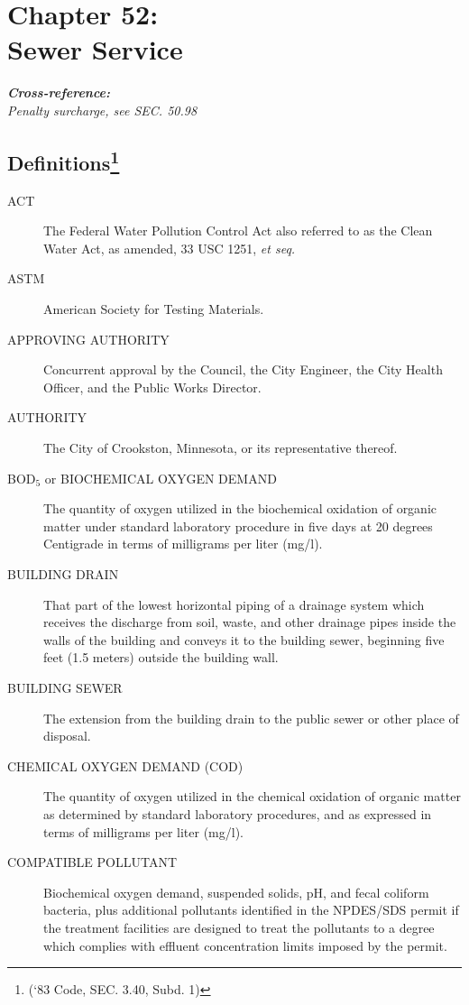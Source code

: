 \chapter*{Chapter 52: \\
	Sewer Service}
    \minitoc
    \textbf{\emph{{Cross-reference:}}}\\
    \indent\emph{Penalty surcharge, see SEC. 50.98}
    \pagebreak



\section{Definitions\footnote{(‘83 Code, SEC. 3.40, Subd. 1)}}
\begin{description}
\item[ACT] The Federal Water Pollution Control Act also referred to as the Clean Water Act, as amended, 33 USC 1251, \emph{et seq.}
\item[ASTM] American Society for Testing Materials.
\item[APPROVING AUTHORITY] Concurrent approval by the Council, the City Engineer, the City Health Officer, and the Public Works Director.
\item[AUTHORITY] The City of Crookston, Minnesota, or its representative thereof.
\item[BOD$_{5}$ or BIOCHEMICAL OXYGEN DEMAND] The quantity of oxygen utilized in the biochemical oxidation of organic matter under standard laboratory procedure in five days at 20 degrees Centigrade in terms of milligrams per liter (mg/l).
\item[BUILDING DRAIN] That part of the lowest horizontal piping of a drainage system which receives the discharge from soil, waste, and other drainage pipes inside the walls of the building and conveys it to the building sewer, beginning five feet (1.5 meters) outside the building wall.
\item[BUILDING SEWER] The extension from the building drain to the public sewer or other place of disposal.
\item[CHEMICAL OXYGEN DEMAND (COD)] The quantity of oxygen utilized in the chemical oxidation of organic matter as determined by standard laboratory procedures, and as expressed in terms of milligrams per liter (mg/l).
\item[COMPATIBLE POLLUTANT] Biochemical oxygen demand, suspended solids, pH, and fecal coliform bacteria, plus additional pollutants identified in the NPDES/SDS permit if the treatment facilities are designed to treat the pollutants to a degree which complies with effluent concentration limits imposed by the permit.

\end{description}
